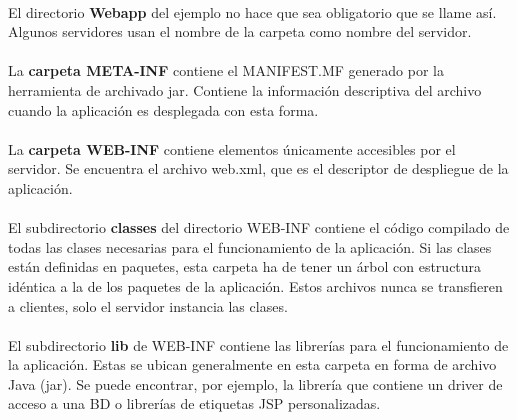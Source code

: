 \documentclass{article}
\begin{document}
	\paragraph{}El directorio \textbf{Webapp} del ejemplo no hace que sea obligatorio que se llame así. Algunos servidores usan el nombre de la carpeta como nombre del servidor.
	
	\paragraph{}La \textbf{carpeta META-INF} contiene el MANIFEST.MF generado por la herramienta de archivado jar. Contiene la información descriptiva del archivo cuando la aplicación es desplegada con esta forma.
	
	\paragraph{}La \textbf{carpeta WEB-INF} contiene elementos únicamente accesibles por el servidor. Se encuentra el archivo web.xml, que es el descriptor de despliegue de la aplicación.
	
	\paragraph{}El subdirectorio \textbf{classes} del directorio WEB-INF contiene el código compilado de todas las clases necesarias para el funcionamiento de la aplicación. Si las clases están definidas en paquetes, esta carpeta ha de tener un árbol con estructura idéntica a la de los paquetes de la aplicación. Estos archivos nunca se transfieren a clientes, solo el servidor instancia las clases.
	
	\paragraph{}El subdirectorio \textbf{lib} de WEB-INF contiene las librerías para el funcionamiento de la aplicación. Estas se ubican generalmente en esta carpeta en forma de archivo Java (jar). Se puede encontrar, por ejemplo, la librería que contiene un driver de acceso a una BD o librerías de etiquetas JSP personalizadas.
	
\end{document}
